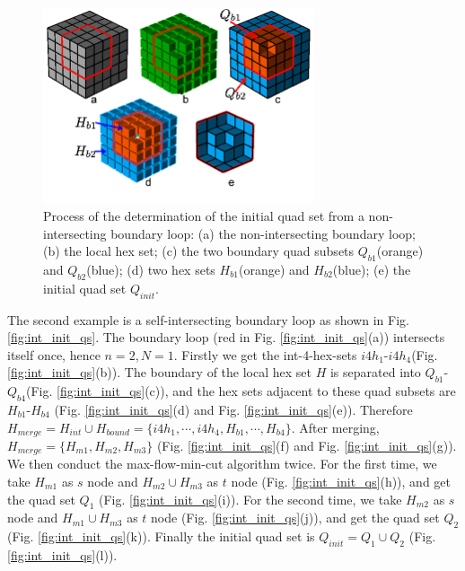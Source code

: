 \documentclass[final,5p,times,twocolumn]{elsarticle}
\begin{document}
\begin{figure}[htbp]
\begin{center}
\includegraphics[width=8cm]{figures/non_int_init_qs.png}
\caption{Process of the determination of the initial quad set from a non-intersecting boundary loop: (a) the non-intersecting boundary loop; (b) the local hex set; (c) the two boundary quad subsets $Q_{b1}$(orange) and $Q_{b2}$(blue); (d) two hex sets $H_{b1}$(orange) and $H_{b2}$(blue); (e) the initial quad set $Q_{init}$.}
\label{fig:non_int_init_qs}
\end{center}
\end{figure}

The second example is a self-intersecting boundary loop as shown in Fig. \ref{fig:int_init_qs}. The boundary loop (red in Fig. \ref{fig:int_init_qs}(a)) intersects itself once, hence $n=2,N=1$. Firstly we get the int-4-hex-sets $i4h_1$-$i4h_4$(Fig. \ref{fig:int_init_qs}(b)). The boundary of the local hex set $H$ is separated into $Q_{b1}$-$Q_{b4}$(Fig. \ref{fig:int_init_qs}(c)), and the hex sets adjacent to these quad subsets are $H_{b1}$-$H_{b4}$ (Fig. \ref{fig:int_init_qs}(d) and Fig. \ref{fig:int_init_qs}(e)). Therefore $H_{merge}=H_{int} \cup H_{bound}=\{i4h_1,\cdots,i4h_4,H_{b1},\cdots,H_{b4}\}$. After merging, $H_{merge}=\{H_{m1},H_{m2},H_{m3}\}$ (Fig. \ref{fig:int_init_qs}(f) and Fig. \ref{fig:int_init_qs}(g)). We then conduct the max-flow-min-cut algorithm twice. For the first time, we take $H_{m1}$ as $s$ node and $H_{m2} \cup H_{m3}$ as $t$ node (Fig. \ref{fig:int_init_qs}(h)), and get the quad set $Q_1$ (Fig. \ref{fig:int_init_qs}(i)). For the second time, we take $H_{m2}$ as $s$ node and $H_{m1} \cup H_{m3}$ as $t$ node (Fig. \ref{fig:int_init_qs}(j)), and get the quad set $Q_2$ (Fig. \ref{fig:int_init_qs}(k)). Finally the initial quad set is $Q_{init}=Q_1 \cup Q_2$ (Fig. \ref{fig:int_init_qs}(l)).
\end{document}
